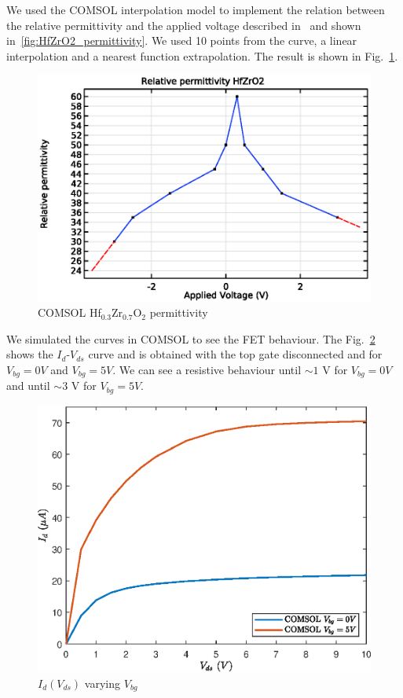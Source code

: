 \documentclass[12pt,a4paper,titlepage]{article}
\begin{document}
We used the COMSOL interpolation model to implement the relation between the relative permittivity and the applied voltage described in~\cite{Dragoman:ferroelectric} and shown in~\ref{fig:HfZrO2_permittivity}. We used 10 points from the curve, a linear interpolation and a nearest function extrapolation. The result is shown in Fig.~\ref{fig:permittivity_HfZrO2}.

\begin{figure}[H]
	\centering
	\includegraphics[width=.7\textwidth]{Grafici/permittivity_HfZrO2.eps} 
	\caption{COMSOL Hf$_{0.3}$Zr$_{0.7}$O$_2$ permittivity}
	\label{fig:permittivity_HfZrO2}
\end{figure}

We simulated the curves in COMSOL to see the FET behaviour. The Fig.~\ref{fig:HfZrO2_Id(Vd)_varying_Vbg} shows the $I_d$-$V_{ds}$ curve and is obtained with the top gate disconnected and for $V_{bg} = 0 V$ and $V_{bg} = 5 V$. We can see a resistive behaviour until $\sim1 $ V for $V_{bg} = 0 V$ and until $\sim3 $ V for $V_{bg} = 5 V$.
\begin{figure}[H]
	\centering
	\includegraphics[width=.8\textwidth]{Grafici/HfZrO2_Id(Vd)_varying_Vbg.eps} 
	\caption{$I_d(V_{ds})$ varying $V_{bg}$}
	\label{fig:HfZrO2_Id(Vd)_varying_Vbg}
\end{figure} 
\end{document}
